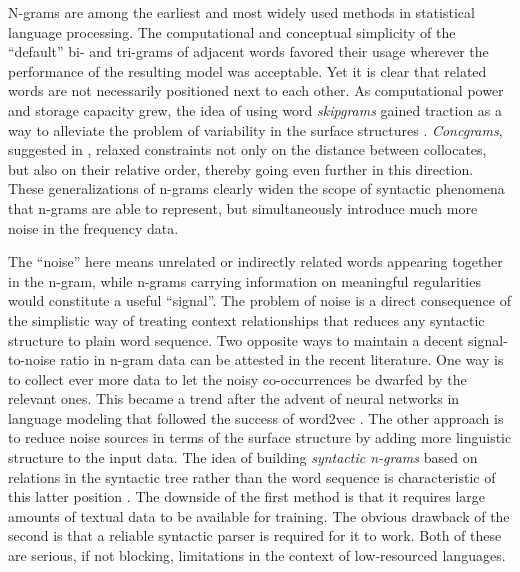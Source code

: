 \documentclass[12pt]{article}
\begin{document}
N-grams are among the earliest and most widely used methods in 
statistical language processing.  %
The computational and conceptual simplicity of the “default” bi- and
tri-grams of adjacent words favored their usage wherever the
performance of the resulting model was acceptable. Yet it is clear
that related words are not necessarily positioned next to each
other. As computational power and storage capacity grew, the idea of
using word \textit{skipgrams} gained traction as a way to
alleviate the problem of variability in the surface
structures \autocite{guthrie-etal-2006-closer}. \textit{Concgrams}, suggested in
\cite{cheng2006concgrams}, relaxed constraints not only on the distance between
collocates, but also on their relative order, thereby going even further in this
direction. These generalizations of n-grams clearly widen the scope of
syntactic phenomena that n-grams are able to represent, but simultaneously
introduce much more noise in the frequency data.

The “noise” here means unrelated or indirectly related words appearing
together in the n-gram, while n-grams carrying information on
meaningful regularities would constitute a useful “signal”. The
problem of noise is a direct consequence of the simplistic way of
treating context relationships that reduces any syntactic structure to
plain word sequence. Two opposite ways to maintain a decent
signal-to-noise ratio in n-gram data can be attested in the recent
literature. One way is to collect ever more data to let the noisy
co-occurrences be dwarfed by the relevant ones. This became a trend
after the advent of neural networks in language modeling that followed
the success of word2vec \autocite{mikolov2013distributed}. The other approach
is to reduce noise sources in terms of the surface structure by adding
more linguistic structure to the input data. The idea of building
\textit{syntactic n-grams} based on relations in the syntactic tree
rather than the word sequence is characteristic of this latter
position \autocite{sidorov2014syntactic}. The downside of the first method is
that it requires large amounts of textual data to be available for
training. The obvious drawback of the second is that a reliable
syntactic parser is required for it to work. Both of these are
serious, if not blocking, limitations in the context of low-resourced
languages.
\end{document}
